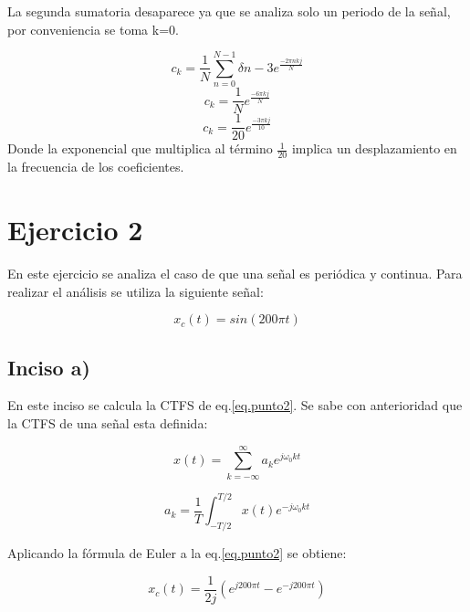 \documentclass{article}
\begin{document}
La segunda sumatoria desaparece ya que se analiza solo un periodo de la señal, por conveniencia se toma k=0.

\begin{equation} 
    c_{k}=\frac{1}{N} \sum_{n=0}^{N-1}\delta{n-3}  e^{\frac{-2 \pi n k j }{N}}
\end{equation}
\begin{equation} 
    c_{k}=\frac{1}{N}  e^{\frac{-6 \pi  k j }{N}}
\end{equation}
\begin{equation} 
    c_{k}=\frac{1}{20}  e^{\frac{-3 \pi  k j }{10}}
\end{equation}
Donde la exponencial que multiplica al término $\frac{1}{20}$ implica un desplazamiento en la frecuencia de los coeficientes.



\section{Ejercicio 2}

    En este ejercicio se analiza el caso de que una señal es periódica y continua. Para realizar el análisis se utiliza la siguiente señal: 

    \begin{equation}
        \label{eq.punto2}
        x_c(t) = sin( 200 \pi t )
    \end{equation}

    \subsection*{Inciso a)}

    En este inciso se calcula la CTFS de eq.\ref{eq.punto2}. Se sabe con anterioridad que la CTFS de una señal
    esta definida:
    
    \begin{equation}
        x(t)= \sum_{k=-\infty}^{\infty} a_k e^{j\omega_0 kt}
    \end{equation}

    \begin{equation}
        a_k = \frac{1}{T} \int_{-T/2}^{T/2} x(t)e^{-j\omega_0 kt}
    \end{equation}

    Aplicando la fórmula de Euler a la eq.\ref{eq.punto2} se obtiene:

    \begin{equation}
        x_c(t)=\frac{1}{2j}( e^{j200\pi t} - e^{-j200 \pi t})
    \end{equation}
\end{document}

